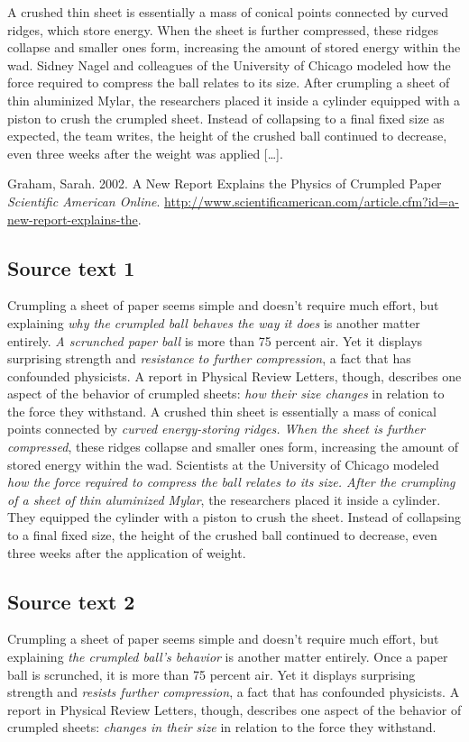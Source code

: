 \documentclass[output=paper]{LSP/langsci}
\begin{document}
A crushed thin sheet is essentially a mass of conical points connected by curved ridges, which store energy. When the sheet is further compressed, these ridges collapse and smaller ones form, increasing the amount of stored energy within the wad. Sidney Nagel and colleagues of the University of Chicago modeled how the force required to compress the ball relates to its size. After crumpling a sheet of thin aluminized Mylar, the researchers placed it inside a cylinder equipped with a piston to crush the crumpled sheet. Instead of collapsing to a final fixed size as expected, the team writes, the height of the crushed ball continued to decrease, even three weeks after the weight was applied […].
 
Graham, Sarah. 2002. A New Report Explains the Physics of Crumpled Paper \textit{Scientific American Online}. \url{http://www.scientificamerican.com/article.cfm?id=a-new-report-explains-the}.

\subsection*{Source text 1}
Crumpling a sheet of paper seems simple and doesn't require much effort, but explaining \textit{why the crumpled ball behaves the way it does} is another matter entirely. \textit{A scrunched paper ball} is more than 75 percent air. Yet it displays surprising strength and \textit{resistance to further compression}, a fact that has confounded physicists. A report in Physical Review Letters, though, describes one aspect of the behavior of crumpled sheets: \textit{how their size changes} in relation to the force they withstand.
A crushed thin sheet is essentially a mass of conical points connected by \textit{curved energy-storing ridges. When the sheet is further compressed}, these ridges collapse and smaller ones form, increasing the amount of stored energy within the wad. Scientists at the University of Chicago modeled \textit{how the force required to compress the ball relates to its size. After the crumpling of a sheet of thin aluminized Mylar}, the researchers placed it inside a cylinder. They equipped the cylinder with a piston to crush the sheet. Instead of collapsing to a final fixed size, the height of the crushed ball continued to decrease, even three weeks after the application of weight.

\subsection*{Source text 2}
Crumpling a sheet of paper seems simple and doesn't require much effort, but explaining \textit{the crumpled ball’s behavior} is another matter entirely. Once a paper ball is scrunched, it is more than 75 percent air. Yet it displays surprising strength and \textit{resists further compression}, a fact that has confounded physicists. A report in Physical Review Letters, though, describes one aspect of the behavior of crumpled sheets: \textit{changes in their size} in relation to the force they withstand.
\end{document}
